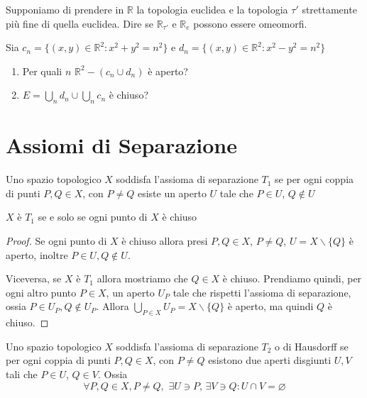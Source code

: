 \begin{example}
    Supponiamo di prendere in \(\mathbb{R}\) la topologia euclidea e la
    topologia \(\tau'\) strettamente più fine di quella euclidea. Dire se
    \(\mathbb{R}_{\tau'}\) e \(\mathbb{R}_e\) possono essere omeomorfi.
\end{example}
\begin{example}
    Sia \(c_n = \{(x, y )  \in  \mathbb{R}^2: x^2+y^2 = n^2\} \) e \(d_n = \{(x,
    y) \in  \mathbb{R}^2 : x^2 - y^2 = n^2\}\)
\begin{enumerate}[label = \arabic*.]
    \item Per quali \(n\) \(\mathbb{R}^2 - (c_n \cup d_n)\) è aperto?
    \item \(E = \bigcup_{n} d_n \cup \bigcup_{n} c_n\) è chiuso?
\end{enumerate}
\end{example}

\section{Assiomi di Separazione}
\begin{definition}
    Uno spazio topologico \(X\) soddisfa l'assioma di separazione \(T_1\) se per
    ogni coppia di punti \(P, Q \in  X\), con \(P \neq Q\) esiste un aperto
    \(U\) tale che \(P \in  U\), \(Q \not\in  U\) 
\end{definition}
\begin{proposition}
    \(X\) è \(T_{1}\) se e solo se ogni punto di \(X\) è chiuso
\end{proposition}
\begin{proof}
    Se ogni punto di \(X\) è chiuso allora presi \(P, Q \in X\), \(P \neq Q\),
    \(U = X \smallsetminus \{Q\}  \) è aperto, inoltre \(P \in U, Q \not\in U\).

    Viceversa, se \(X\) è \(T_{1}\) allora mostriamo che \(Q \in X\) è chiuso.
    Prendiamo quindi, per ogni altro punto \(P \in X\), un aperto \(U_P\) tale
    che rispetti l'assioma di separazione, ossia \(P \in U_P, Q \not\in U_P\).
    Allora \(\bigcup_{P \in X} U_P = X \smallsetminus \{Q\} \) è aperto, ma
    quindi \(Q\) è chiuso.
\end{proof}

\begin{definition}
    Uno spazio topologico \(X\) soddisfa l'assioma di separazione \(T_2\) o di
    Hausdorff se per ogni coppia di punti \(P, Q \in  X\), con \(P \neq Q\)
    esistono due aperti disgiunti \(U, V\) tali che \(P \in  U\), \(Q \in  V\).
    Ossia
    \[
        \forall P, Q \in X, P \neq Q,\,\, \exists U \ni P, \,\exists V \ni Q : U \cap V = \varnothing
    \]
\end{definition}

